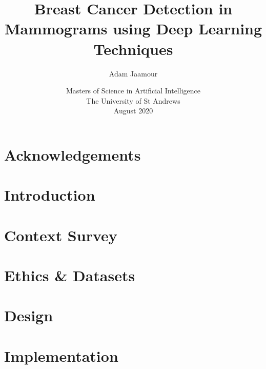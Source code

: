 \documentclass[11pt,oneside,a4paper]{report} %
\title{Breast Cancer Detection in Mammograms using Deep Learning Techniques}
\author{Adam Jaamour}
\date{Masters of Science in Artificial Intelligence\\The University of St Andrews\\August 2020}
\begin{document}
\setcounter{page}{0}

\maketitle
\newpage

\newpage

\abstract

\newpage

\setcounter{tocdepth}{3}
\tableofcontents
\newpage
\listoffigures
\newpage
\listoftables
\newpage

\printnomenclature 
\newpage

\chapter*{Acknowledgements}

\newpage


\setcounter{page}{1}

\chapter{Introduction}
\label{ch:chapter-intro}


\chapter{Context Survey}
\label{ch:chapter-litsurvey}


\chapter{Ethics \& Datasets}
\label{ch:chapter-ethics-datasets}


\chapter{Design}
\label{ch:chapter-design}


\chapter{Implementation}
\label{ch:chapter-implementation}

\end{document}
